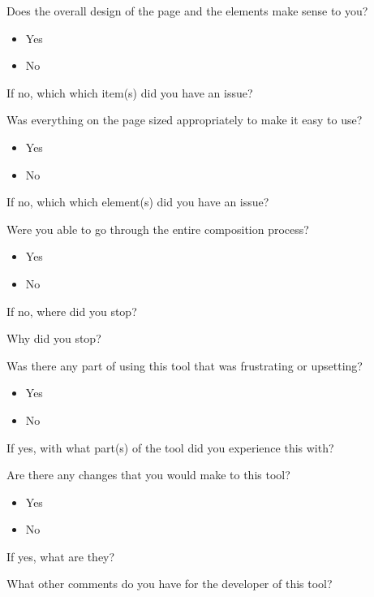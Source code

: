 \noindent Does the overall design of the page and the elements make sense to you?

\begin{itemize}
	\item Yes
	\item No
\end{itemize}

\noindent If no, which which item(s) did you have an issue?

\vspace{\baselineskip}

\noindent Was everything on the page sized appropriately to make it easy to use?

\begin{itemize}
	\item Yes
	\item No
\end{itemize}

\noindent If no, which which element(s) did you have an issue?

\vspace{\baselineskip}

\noindent Were you able to go through the entire composition process?

\begin{itemize}
	\item Yes
	\item No
\end{itemize}

\noindent If no, where did you stop?

\vspace{\baselineskip}

\noindent Why did you stop?

\vspace{\baselineskip}

\noindent Was there any part of using this tool that was frustrating or upsetting?

\begin{itemize}
	\item Yes
	\item No
\end{itemize}

\noindent If yes, with what part(s) of the tool did you experience this with?

\vspace{\baselineskip}

\noindent Are there any changes that you would make to this tool?

\begin{itemize}
	\item Yes
	\item No
\end{itemize}

\noindent If yes, what are they?

\vspace{\baselineskip}

\noindent What other comments do you have for the developer of this tool?